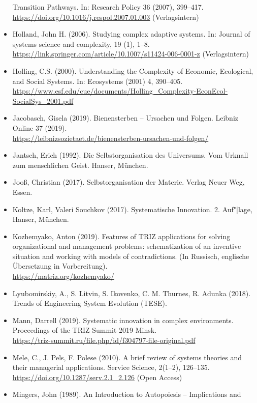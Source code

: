 \documentclass[11pt,a4paper]{article}
\begin{document}
\begin{itemize}
  Transition Pathways. In: Research Policy 36 (2007), 399–417.\\
  \url{https://doi.org/10.1016/j.respol.2007.01.003} (Verlagsintern)
\item Holland, John H. (2006). Studying complex adaptive systems. In: Journal
  of systems science and complexity, 19 (1),
  1–8.\\ \url{https://link.springer.com/article/10.1007/s11424-006-0001-z}
  (Verlagsintern)
\item Holling, C.S. (2000). Understanding the Complexity of Economic,
  Ecological, and Social Systems. In: Ecosystems (2001) 4, 390–405.
  \url{https://www.esf.edu/cue/documents/Holling_Complexity-EconEcol-SocialSys_2001.pdf}
\item Jacobasch, Gisela (2019). Bienensterben -- Ursachen und Folgen.  Leibniz
  Online 37 (2019).\\
  \url{https://leibnizsozietaet.de/bienensterben-ursachen-und-folgen/}
\item Jantsch, Erich (1992). Die Selbstorganisation des Universums. Vom
  Urknall zum menschlichen Geist.  Hanser, München.
\item Jooß, Christian (2017). Selbstorganisation der Materie.  Verlag Neuer
  Weg, Essen.
\item Koltze, Karl, Valeri Souchkov (2017). Systematische Innovation.
  2. Auf"|lage, Hanser, München.
\item Kozhemyako, Anton (2019). Features of TRIZ applications for solving
  organizational and management problems: schematization of an inventive
  situation and working with models of contradictions. (In Russisch, englische
  Übersetzung in Vorbereitung).\\ \url{https://matriz.org/kozhemyako/}
\item Lyubomirskiy, A., S. Litvin, S. Ikovenko, C. M. Thurnes, R. Adunka
  (2018).  Trends of Engineering System Evolution (TESE).
\item Mann, Darrell (2019).  Systematic innovation in complex
  environments. Proceedings of the TRIZ Summit 2019 Minsk.\\
  \url{https://triz-summit.ru/file.php/id/f304797-file-original.pdf} 
\item Mele, C., J. Pels, F. Polese (2010). A brief review of systems theories
  and their managerial applications. Service Science, 2(1--2), 126--135.\\
  \url{https://doi.org/10.1287/serv.2.1_2.126} (Open Access)
\item Mingers, John (1989). An Introduction to Autopoiesis -- Implications and

\end{itemize}
\end{document}
